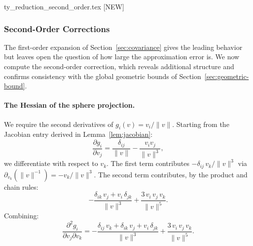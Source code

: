 ty_reduction_second_order.tex [NEW]
%
%
%
%
%

\subsubsection{Second-Order Corrections}
\label{sec:second-order}

The first-order expansion of Section~\ref{sec:covariance} gives the
leading behavior but leaves open the question of how large the
approximation error is.
We now compute the second-order correction, which reveals additional
structure and confirms consistency with the global geometric bounds
of Section~\ref{sec:geometric-bound}.

\paragraph{The Hessian of the sphere projection.}

We require the second derivatives of $g_i(v) = v_i / \|v\|$.
Starting from the Jacobian entry derived in Lemma~\ref{lem:jacobian}:
%
\begin{equation}
  \frac{\partial g_i}{\partial v_j}
  = \frac{\delta_{ij}}{\|v\|} - \frac{v_i v_j}{\|v\|^3},
\end{equation}
%
we differentiate with respect to $v_k$.
The first term contributes $-\delta_{ij}\,v_k / \|v\|^3$ via
$\partial_{v_k}(\|v\|^{-1}) = -v_k / \|v\|^3$.
The second term contributes, by the product and chain rules:
%
\begin{equation}
  -\frac{\delta_{ik}\,v_j + v_i\,\delta_{jk}}{\|v\|^3}
  + \frac{3\,v_i\,v_j\,v_k}{\|v\|^5}.
\end{equation}
%
Combining:
%
\begin{equation}
  \frac{\partial^2 g_i}{\partial v_j \partial v_k}
  = -\frac{\delta_{ij}\,v_k + \delta_{ik}\,v_j + v_i\,\delta_{jk}}{\|v\|^3}
  + \frac{3\,v_i\,v_j\,v_k}{\|v\|^5}.
  \label{eq:hessian-components}
\end{equation}

